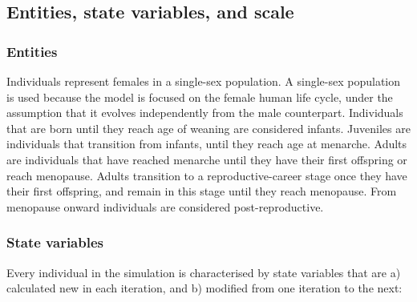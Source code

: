 \documentclass{article}
\begin{document}
\subsection{Entities, state variables, and scale}

\subsubsection{Entities}

Individuals represent females in a single-sex population. A single-sex population is used because the model is focused on the female human life cycle, under the assumption that it evolves independently from the male counterpart. Individuals that are born until they reach age of weaning are considered infants. Juveniles are individuals that transition from infants, until they reach age at menarche. Adults are individuals that have reached menarche until they have their first offspring or reach menopause. Adults transition to a reproductive-career stage once they have their first offspring, and remain in this stage until they reach menopause. From menopause onward individuals are considered post-reproductive.

\subsubsection{State variables}

Every individual in the simulation is characterised by state variables that are a) calculated new in each iteration, and b) modified from one iteration to the next:
\end{document}
